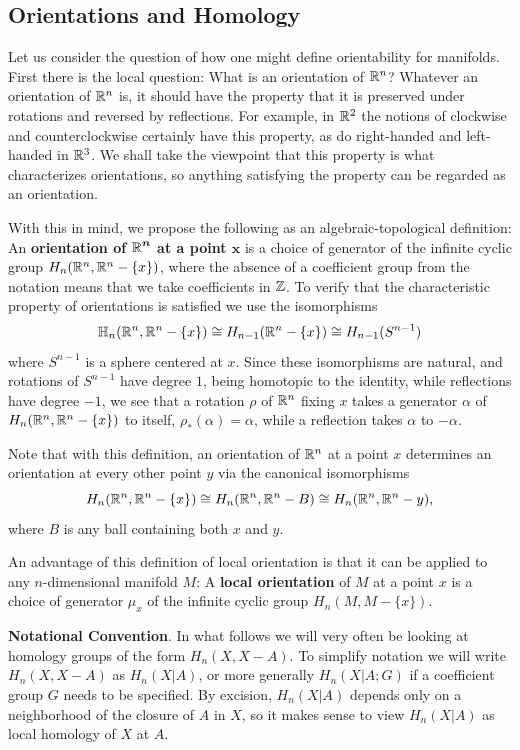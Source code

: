 \subsection{Orientations and Homology}
Let us consider the question of how one might define orientability for manifolds. First there is the local question: What is an orientation of $\mathbb{R}^n$? Whatever an orientation of $\mathbb{R}^n$ is, it should have the property that it is preserved under rotations and reversed by reflections. For example, in $\mathbb{R}^2$ the notions of clockwise and counterclockwise certainly have this property, as do right-handed and left-handed in $\mathbb{R}^3$. We shall take the viewpoint that this property is what characterizes orientations, so anything satisfying the property can be regarded as an orientation.\par
With this in mind, we propose the following as an algebraic-topological definition: An \textbf{orientation of $\bm{\mathbb{R}^n}$ at a point $\bm{x}$} is a choice of generator of the infinite cyclic group $H_n(\mathbb{R}^n,\mathbb{R}^n-\{x\})$, where the absence of a coefficient group from the notation means that we take coefficients in $\mathbb{Z}$. To verify that the characteristic property of orientations is satisfied we use the isomorphisms \[\mathbb{H}_n(\mathbb{R}^n,\mathbb{R}^n-\{x\})\cong H_{n-1}(\mathbb{R}^n-\{x\})\cong H_{n-1}(S^{n-1})\]
where $S^{n-1}$ is a sphere centered at $x$. Since these isomorphisms are natural, and rotations of $S^{n-1}$ have degree $1$, being homotopic to the identity, while reflections have degree $-1$, we see that a rotation $\rho$ of $\mathbb{R}^n$ fixing $x$ takes a generator $\alpha$ of $H_n(\mathbb{R}^n,\mathbb{R}^n-\{x\})$ to itself, $\rho_*(\alpha)=\alpha$, while a reflection takes $\alpha$ to $-\alpha$.\par
Note that with this definition, an orientation of $\mathbb{R}^n$ at a point $x$ determines an orientation at every other point $y$ via the canonical isomorphisms
\[H_n(\mathbb{R}^n,\mathbb{R}^n-\{x\})\cong H_n(\mathbb{R}^n,\mathbb{R}^n-B)\cong H_n(\mathbb{R}^n,\mathbb{R}^n-y),\]
where $B$ is any ball containing both $x$ and $y$.\par
\vspace{5mm}
An advantage of this definition of local orientation is that it can be applied to any $n$-dimensional manifold $M$: A \textbf{local orientation} of $M$ at a point $x$ is a choice of generator $\mu_x$ of the infinite cyclic group $H_n(M,M-\{x\})$.\par
\textbf{Notational Convention}. In what follows we will very often be looking at homology groups of the form $H_n(X,X-A)$. To simplify notation we will write $H_n(X,X-A)$ as $H_n(X|A)$, or more generally $H_n(X|A;G)$ if a coefficient group $G$ needs to be specified. By excision, $H_n(X|A)$ depends only on a neighborhood of the closure of $A$ in $X$, so it makes sense to view $H_n(X|A)$ as local homology of $X$ at $A$.\par
